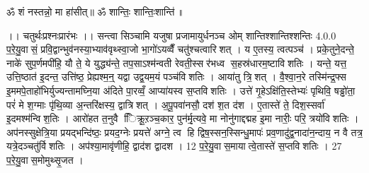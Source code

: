 ॐ शं नस्तन्नो॒ मा हा॑सीत्॥ ॐ शान्तिः॒ शान्तिः॒शान्ति॑॥



\setcounter{anuvakam}{0}
।। चतुर्थःप्रश्नःप्रारंभः ।। सन्त्वा सिञ्चामि यजुषा प्रजामायुर्धनञ्च ओम् शान्तिश्शान्तिश्शन्तिः
4.0.0
प॒रे॒यु॒वासं॒ प्रवि॒द्वान्भुव॑नस्या॒भ्याव॑वृथ्स्वा॒जो भा॒गो॑ऽयव्वैँ चतु॑श्चत्वारिशत् । य ए॒तस्य॒ त्वत्पञ्च॑ । प्रके॒तुने॒दन्ते॒ नाके॑ सुप॒र्णमपी॑हि॒ यौ ते॒ ये युद्ध्य॑न्ते॒ तप॒साऽश्म॑न्वती रेवती॒स्सर॑भध्व स॒हस्र॑धारम॒ष्टाविशतिः । यन्ते॒ यत्त॒ उत्ति॒ष्ठात॑ इ॒दन्त॒ उत्ति॑ष्ठ॒ प्रेह्यश्म॒न्॒ यद्वा उद्व॒यम॒यं पञ्च॑विशतिः । आया॑तु त्रि॒शत् । वै॒श्वा॒न॒रे तस्मि॑न्द्र॒फ्स इ॒ममपे॒ताहो॑भिर्युज्यन्तामघ्नि॒या अ॑दिते पा॒रव्वँ॒ आप्या॑यस्व स॒प्तविशतिः । उत्ते॑ गृ॒हेऽक्षि॑ति॒स्तेभ्यः॑ पृथिवि॒ षड्ढो॑ता॒ परं॑ मे श॒ग्माः पृ॑थि॒व्या अ॒न्तरि॑क्षस्य॒ द्वात्रिशत् । अ॒पू॒पवा॑नसौ॒ दश॑ श॒त द॑श । ए॒तास्ते॑ ते॒ दिश॒स्सर्वा॑ इ॒दमश्म॑न्विश॒तिः । आरो॑हत त॒नुवै ििक्रू॒ऱञ्च॒कार॒ पुन॑र्मृ॒त्यवे॒ मा नोनु॑गाद्दद्मह इ॒मा नारीः॒ परि॒ त्रयो॑विशतिः । अप॑नस्सुक्षेत्रि॒या प्रयद्भन्दि॑ष्ठः॒ प्रयद॒ग्नेः प्रयत्ते॑ अग्ने॒ त्व हि द्विष॒स्सन॒स्सिन्धु॒मापः॑ प्रव॒णादु॑द्व॒नादा॑न॒न्दाय॒ न वै तत्र॒ यत्रे॒दञ्चतु॑र्विशतिः । अप॑श्या॒मावृ॑णीहि॒ द्वाद॑श द्वादश । 12 प॒रे॒यु॒वास॒मायात्वे॒तास्ते॑ स॒प्तविशतिः । 27 प॒रे॒यु॒वास॒मोमुथ्सृ॒जत ।
\anuvakamend


